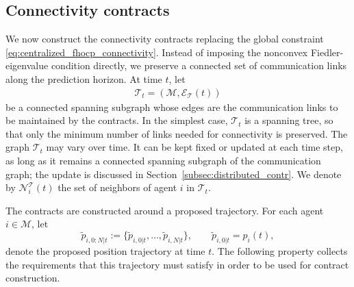 \documentclass[letterpaper, 10 pt, conference]{ieeeconf}  %
\begin{document}
\subsection{Connectivity contracts}

We now construct the connectivity contracts replacing the global constraint
\eqref{eq:centralized_fhocp_connectivity}. Instead of imposing the nonconvex
Fiedler-eigenvalue condition directly, we preserve a connected set of
communication links along the prediction horizon. At time $t$, let
\begin{align}
	\mathcal{T}_t
	=
	\left(\mathcal{M},\mathcal{E}_{\mathcal{T}}(t)\right)
\end{align}
be a connected spanning subgraph whose edges are the communication links to be
maintained by the contracts. In the simplest case, $\mathcal{T}_t$ is a spanning tree, so that
only the minimum number of links needed for connectivity is preserved.
The graph $\mathcal{T}_t$ may vary over time. It can be kept fixed or updated at each time step, as long as it remains a connected spanning subgraph of the communication graph; the update is discussed in Section~\ref{subsec:distributed_contr}. We denote by $\mathcal{N}^{\mathcal{T}}_i(t)$ the set of neighbors of agent $i$ in $\mathcal{T}_t$.

The contracts are constructed around a proposed trajectory. For each agent
$i\in\mathcal{M}$, let
\[
	\tilde p_{i,0:N|t}
	:=
	\{\tilde p_{i,0|t},\ldots,\tilde p_{i,N|t}\},
	\qquad
	\tilde p_{i,0|t}=p_i(t),
\]
denote the proposed position trajectory at time $t$. The following property
collects the requirements that this trajectory must satisfy in order to be used
for contract construction.
\end{document}
